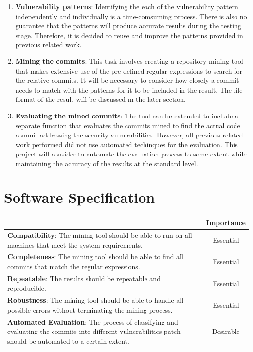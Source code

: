 \documentclass[12pt, a4paper]{report}
\begin{document}
{\begin{enumerate}
	\item \textbf{Vulnerability patterns}: Identifying the each of the vulnerability pattern
	independently and individually is a time-comsuming process. There is also no guarantee that the
	patterns will produce accurate results during the testing stage. Therefore, it is decided to reuse
	and improve the patterns provided in previous related work.
	\item \textbf{Mining the commits}: This task involves creating a repository mining tool that makes
	extensive use of the pre-defined regular expressions to search for the relative commits. It will
	be necessary to consider how closely a commit needs to match with the patterns for it to be
	included in the result. The file format of the result will be discussed in the later section.
	\item \textbf{Evaluating the mined commits}: The tool can be extended to include a separate
	function that evaluates the commits mined to find the actual code commit addressing the security
	vulnerabilities. However, all previous related work performed did not use automated techinques for
	the evaluation. This project will consider to automate the evaluation process to some extent while
	maintaining the accuracy of the results at the standard level.
\end{enumerate}

\section{Software Specification}
\begin{table}[H]
	\begin{center}
		\begin{tabular}{|p{9.5cm}|c|}
			\hline
			\rowcolor[HTML]{D8D8D8}
			\multicolumn{1}{|c|}{Criteria} & Importance \\ \hline
			\textbf{Compatibility}: The mining tool should be able to run on all machines that meet the
			system requirements. & Essential \\ \hline
			\textbf{Completeness}: The mining tool should be able to find all commits that match the
			regular expressions. & Essential \\ \hline
			\textbf{Repeatable}: The results should be repeatable and reproducible. & Essential \\ \hline
			\textbf{Robustness}: The mining tool should be able to handle all possible errors without
			terminating the mining process. & Essential \\ \hline
			\textbf{Automated Evaluation}: The process of classifying and evaluating the commits into
			different vulnerabilities patch should be automated to a certain extent. & Desirable \\ \hline
			\end{tabular}
		 \label{table:criteria}
	\end{center}
\end{table}

}
\end{document}
